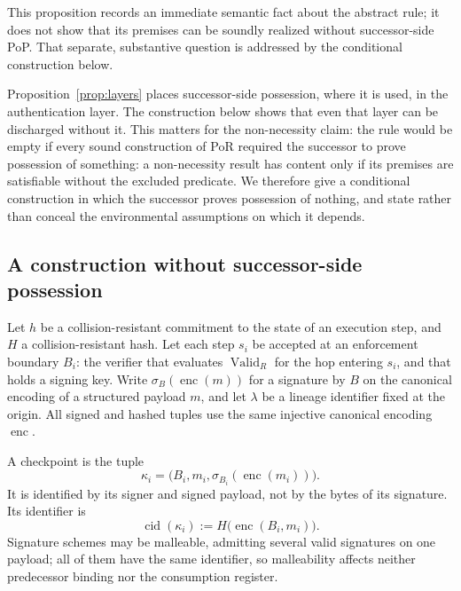 \documentclass[10pt,twocolumn]{article}
\newcommand{\ValidR}{\operatorname{Valid}_{R}}
\begin{document}
This proposition records an immediate semantic fact about the abstract rule;
it does not show that its premises can be soundly realized without
successor-side PoP. That separate, substantive question is addressed by the
conditional construction below.

Proposition~\ref{prop:layers} places successor-side possession, where it is
used, in the authentication layer. The construction below shows that even that
layer can be discharged without it. This matters for the non-necessity claim:
the rule would be empty if every sound construction of PoR required the
successor to prove possession of something: a non-necessity result has content
only if its premises are satisfiable without the excluded predicate. We
therefore give a conditional construction in which the successor proves
possession of nothing, and state rather than conceal the environmental
assumptions on which it depends.

\subsection{A construction without successor-side possession}
\label{sec:witness}

Let \(h\) be a collision-resistant commitment to the state of an execution
step, and \(H\) a collision-resistant hash. Let each step \(s_i\) be accepted at
an enforcement boundary \(B_i\): the verifier that evaluates \(\ValidR\) for the
hop entering \(s_i\), and that holds a signing key. Write
\(\sigma_B(\operatorname{enc}(m))\) for a signature by \(B\) on the canonical
encoding of a structured payload \(m\), and let \(\lambda\) be a lineage
identifier fixed at the origin. All signed and hashed tuples use the same
injective canonical encoding \(\operatorname{enc}\).

A checkpoint is the tuple
\[
\kappa_i=
\bigl(B_i,m_i,\sigma_{B_i}(\operatorname{enc}(m_i))\bigr).
\]
It is identified by its signer and signed payload, not by the bytes of its
signature. Its identifier is
\[
\operatorname{cid}(\kappa_i)
:=
H\big(\operatorname{enc}(B_i,m_i)\big).
\]
Signature schemes may be malleable, admitting several valid signatures on one
payload; all of them have the same identifier, so malleability affects neither
predecessor binding nor the consumption register.
\end{document}
